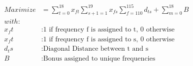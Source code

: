 \documentclass{article}
\begin{document}
\begin{align*}
Maximize &= \sum_{t=0}^{18}x_{ft} \sum_{s+1 = 1}^{19}x_{fs} \sum_{f=110}^{115}d_{ts} + \sum_{m=0}^{18}B\\
with:&\\
x_ft &: \text{1 if frequency f is assigned to t, 0 otherwise}\\
x_ft &: \text{1 if frequency f is assigned to s, 0 otherwise}\\
d_ts &: \text{Diagonal Distance between t and s}\\
B &: \text{Bonus assigned to unique frequencies}
\end{align*}
\end{document}
